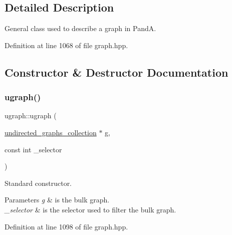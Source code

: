 \subsection{Detailed Description}
General class used to describe a graph in PandA. 

Definition at line 1068 of file graph.\+hpp.



\subsection{Constructor \& Destructor Documentation}
\mbox{\label{structugraph_ab12a1f8a2e62cde4546ba4ad9e784dcf}} 
\subsubsection{\texorpdfstring{ugraph()}{ugraph()}\hspace{0.1cm}{\footnotesize\ttfamily [1/2]}}
{\footnotesize\ttfamily ugraph\+::ugraph (\begin{DoxyParamCaption}\item[{\hyperlink{structundirected__graphs__collection}{undirected\+\_\+graphs\+\_\+collection} $\ast$}]{g,  }\item[{const int}]{\+\_\+selector }\end{DoxyParamCaption})\hspace{0.3cm}{\ttfamily [inline]}}



Standard constructor. 


\begin{DoxyParams}{Parameters}
{\em g} & is the bulk graph. \\
\hline
{\em \+\_\+selector} & is the selector used to filter the bulk graph. \\
\hline
\end{DoxyParams}


Definition at line 1098 of file graph.\+hpp.

\mbox{\label{structugraph_a9a9f0cf29d958e16981411a2a4daa2cf}} 
